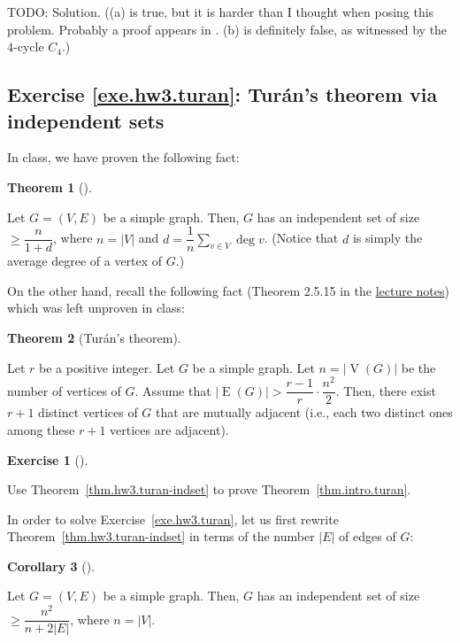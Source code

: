 \documentclass[numbers=enddot,12pt,final,onecolumn,notitlepage]{scrartcl}%
\newcounter{exer}
\theoremstyle{definition}
\newtheorem{theo}{Theorem}[section]
\newenvironment{theorem}[1][]
{\begin{theo}[#1]\begin{leftbar}}
{\end{leftbar}\end{theo}}
\newtheorem{coro}[theo]{Corollary}
\newenvironment{corollary}[1][]
{\begin{coro}[#1]\begin{leftbar}}
{\end{leftbar}\end{coro}}
\newtheorem{exmp}[exer]{Exercise}
\newenvironment{exercise}[1][]
{\begin{exmp}[#1]\begin{leftbar}}
{\end{leftbar}\end{exmp}}
\let\sumnonlimits\sum
\renewcommand{\sum}{\sumnonlimits\limits}
\newcommand{\abs}[1]{\left| #1 \right|}
\newcommand{\tup}[1]{\left( #1 \right)}
\newcommand{\verts}[1]{\operatorname{V}\left( #1 \right)}
\newcommand{\edges}[1]{\operatorname{E}\left( #1 \right)}
\begin{document}
TODO: Solution. ((a) is true, but it is harder than I thought
when posing this problem. Probably a proof appears in
\cite{AGJJ09}. (b) is definitely false,
as witnessed by the $4$-cycle $C_4$.)

\subsection{Exercise \ref{exe.hw3.turan}: Tur\'an's theorem via
independent sets}

In class, we have proven the following fact:

\begin{theorem} \label{thm.hw3.turan-indset}
Let $G = \tup{V, E}$ be a simple graph.
Then, $G$ has an independent set of size
$\geq \dfrac{n}{1+d}$, where $n = \abs{V}$ and
$d = \dfrac{1}{n} \sum_{v \in V} \deg v$.
(Notice that $d$ is simply the average degree of a vertex of $G$.)
\end{theorem}

On the other hand, recall the following fact
(Theorem 2.5.15 in the
\href{http://www-users.math.umn.edu/~dgrinber/5707s17/nogra.pdf}{lecture notes})
which was left unproven in class:

\begin{theorem}[Tur\'an's theorem] \label{thm.intro.turan}
Let $r$ be a positive integer.
Let $G$ be a simple graph. Let $n = \abs{\verts{G}}$ be the number of
vertices of $G$. Assume that
$\abs{\edges{G}} > \dfrac{r-1}{r} \cdot \dfrac{n^2}{2}$. Then, there
exist $r + 1$ distinct vertices
of $G$ that are mutually adjacent (i.e., each two distinct ones among
these $r + 1$ vertices are adjacent).
\end{theorem}

\begin{exercise} \label{exe.hw3.turan}
Use Theorem~\ref{thm.hw3.turan-indset} to prove
Theorem~\ref{thm.intro.turan}.
\end{exercise}

In order to solve Exercise~\ref{exe.hw3.turan}, let us first rewrite
Theorem~\ref{thm.hw3.turan-indset} in terms of the number $\abs{E}$ of
edges of $G$:

\begin{corollary} \label{cor.hw3.turan-indset.edges}
Let $G = \tup{V, E}$ be a simple graph.
Then, $G$ has an independent set of size
$\geq \dfrac{n^2}{n+2\abs{E}}$, where $n = \abs{V}$.
\end{corollary}
\end{document}
